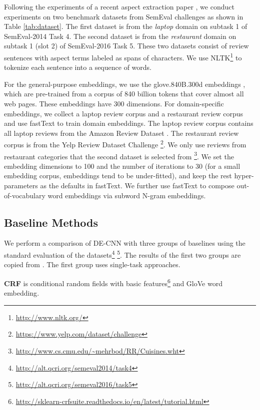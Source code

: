 \documentclass[11pt,a4paper]{article}
\begin{document}
Following the experiments of a recent aspect extraction paper \cite{li2017deep},
we conduct experiments on two benchmark datasets from SemEval challenges \cite{pontiki2014SemEval,pontiki2016semeval} as shown in Table \ref{tab:dataset}. 
The first dataset is from the \textit{laptop} domain on subtask 1 of SemEval-2014 Task 4.
The second dataset is from the \textit{restaurant} domain on subtask 1 (slot 2) of SemEval-2016 Task 5.
These two datasets consist of review sentences with aspect terms labeled as spans of characters.
We use NLTK\footnote{\url{http://www.nltk.org/} } to tokenize each sentence into a sequence of words. 

For the general-purpose embeddings, we use the glove.840B.300d embeddings \cite{pennington2014glove}, which are pre-trained from a corpus of 840 billion tokens that cover almost all web pages. These embeddings have 300 dimensions.
For domain-specific embeddings, we collect a laptop review corpus and a restaurant review corpus and use fastText \cite{bojanowski2016enriching} to train domain embeddings.  
The laptop review corpus contains all laptop reviews from the Amazon Review Dataset \cite{he2016ups}.
The restaurant review corpus is from the Yelp Review Dataset Challenge \footnote{\url{https://www.yelp.com/dataset/challenge} }.
We only use reviews from restaurant categories that the second dataset is selected from \footnote{\url{http://www.cs.cmu.edu/~mehrbod/RR/Cuisines.wht} }.
We set the embedding dimensions to 100 and the number of iterations to 30 (for a small embedding corpus, embeddings tend to be under-fitted), and keep the rest hyper-parameters as the defaults in fastText.
We further use fastText to compose out-of-vocabulary word embeddings via subword N-gram embeddings.

\subsection{Baseline Methods}
We perform a comparison of DE-CNN with three groups of baselines using the standard evaluation of the datasets\footnote{\url{http://alt.qcri.org/semeval2014/task4}} \footnote{\url{http://alt.qcri.org/semeval2016/task5}}.
The results of the first two groups are copied from \cite{li2017deep}.
The first group uses single-task approaches.

\textbf{CRF} is conditional random fields with basic features\footnote{\url{http://sklearn-crfsuite.readthedocs.io/en/latest/tutorial.html} } and GloVe word embedding\cite{pennington2014glove}.
\end{document}
